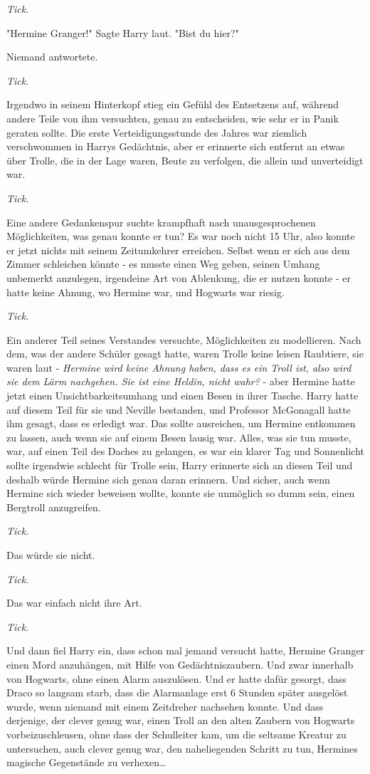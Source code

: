 {\emph{Tick}.

"Hermine Granger!" Sagte Harry laut. "Bist du hier?"

Niemand antwortete.

\emph{Tick}.

Irgendwo in seinem Hinterkopf stieg ein Gefühl des Entsetzens auf, während andere Teile von ihm versuchten, genau zu entscheiden, wie sehr er in Panik geraten sollte. Die erste Verteidigungsstunde des Jahres war ziemlich verschwommen in Harrys Gedächtnis, aber er erinnerte sich entfernt an etwas über Trolle, die in der Lage waren, Beute zu verfolgen, die allein und unverteidigt war.

\emph{Tick}.

Eine andere Gedankenspur suchte krampfhaft nach unausgesprochenen Möglichkeiten, was genau konnte er tun? Es war noch nicht 15 Uhr, also konnte er jetzt nichts mit seinem Zeitumkehrer erreichen. Selbst wenn er sich aus dem Zimmer schleichen könnte - es musste einen Weg geben, seinen Umhang unbemerkt anzulegen, irgendeine Art von Ablenkung, die er nutzen konnte - er hatte keine Ahnung, wo Hermine war, und Hogwarts war riesig.

\emph{Tick}.

Ein anderer Teil seines Verstandes versuchte, Möglichkeiten zu modellieren. Nach dem, was der andere Schüler gesagt hatte, waren Trolle keine leisen Raubtiere, sie waren laut - \emph{Hermine wird keine Ahnung haben, dass es ein Troll ist, also wird sie dem Lärm nachgehen. Sie ist eine Heldin, nicht wahr?} - aber Hermine hatte jetzt einen Unsichtbarkeitsumhang und einen Besen in ihrer Tasche. Harry hatte auf diesem Teil für sie und Neville bestanden, und Professor McGonagall hatte ihm gesagt, dass es erledigt war. Das sollte ausreichen, um Hermine entkommen zu lassen, auch wenn sie auf einem Besen lausig war. Alles, was sie tun musste, war, auf einen Teil des Daches zu gelangen, es war ein klarer Tag und Sonnenlicht sollte irgendwie schlecht für Trolle sein, Harry erinnerte sich an diesen Teil und deshalb würde Hermine sich genau daran erinnern. Und sicher, auch wenn Hermine sich wieder beweisen wollte, konnte sie unmöglich so dumm sein, einen Bergtroll anzugreifen.

\emph{Tick}.

Das würde sie nicht.

\emph{Tick}.

Das war einfach nicht ihre Art.

\emph{Tick}.

Und dann fiel Harry ein, dass schon mal jemand versucht hatte, Hermine Granger einen Mord anzuhängen, mit Hilfe von Gedächtniszaubern. Und zwar innerhalb von Hogwarts, ohne einen Alarm auszulösen. Und er hatte dafür gesorgt, dass Draco so langsam starb, dass die Alarmanlage erst 6 Stunden später ausgelöst wurde, wenn niemand mit einem Zeitdreher nachsehen konnte. Und dass derjenige, der clever genug war, einen Troll an den alten Zaubern von Hogwarts vorbeizuschleusen, ohne dass der Schulleiter kam, um die seltsame Kreatur zu untersuchen, auch clever genug war, den naheliegenden Schritt zu tun, Hermines magische Gegenstände zu verhexen…

}
